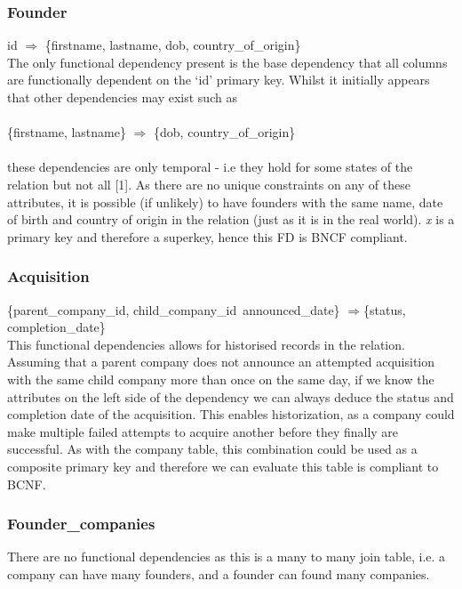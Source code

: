 \documentclass[12pt]{article}
\begin{document}
\subsubsection{Founder}
id $\Rightarrow$ \{{firstname, lastname, dob, country\_of\_origin\}}\\

The only functional dependency present is the base dependency that all columns are functionally dependent on the `id' primary key. Whilst it initially appears that other dependencies may exist such as \\\\
\{{firstname, lastname\}} $\Rightarrow$ \{{dob, country\_of\_origin\}}\\\\
these dependencies are only temporal - i.e they hold for some states of the relation but not all [1]. As there are no unique constraints on any of these attributes, it is possible (if unlikely) to have founders with the same name, date of birth and country of origin in the relation (just as it is in the real world). \emph{x} is a primary key and therefore a superkey, hence this FD is BNCF compliant.

\subsubsection{Acquisition}
\{{parent\_company\_id, child\_company\_id\, announced\_date}\} $\Rightarrow${\{status, completion\_date}\} \\

This functional dependencies allows for historised records in the relation. Assuming that a parent company does not announce an attempted acquisition with the same child company more than once on the same day, if we know the attributes on the left side of the dependency we can always deduce the status and completion date of the acquisition. This enables historization, as a company could make multiple failed attempts to acquire another before they finally are successful. As with the company table, this combination could be used as a composite primary key and therefore we can evaluate this table is compliant to BCNF.

\subsubsection{Founder\_companies}
There are no functional dependencies as this is a many to many join table, i.e. a company can have many founders, and a founder can found many companies.
\end{document}
